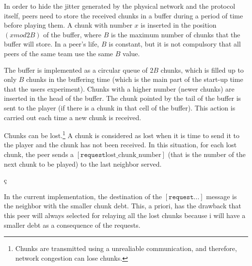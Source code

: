 
\label{sec:buffering_chunks}

In order to hide the jitter generated by the physical network and the
protocol itself, peers need to store the received chunks in a buffer
during a period of time before playing them. A chunk with number $x$
is inserted in the position $(x \mathit{mod} 2B)$ of the buffer, where
$B$ is the maximum number of chunks that the buffer will store. In a
peer's life, $B$ is constant, but it is not compulsory that all peers
of the same team use the same $B$ value.

The buffer is implemented as a circular queue of $2B$ chunks, which is
filled up to only $B$ chunks in the buffering time (which is the main
part of the start-up time that the users experiment). Chunks with a
higher number (newer chunks) are inserted in the head of the
buffer. The chunk pointed by the tail of the buffer is sent to the
player (if there is a chunk in that cell of the buffer). This action
is carried out each time a new chunk is received.

Chunks can be lost.\footnote{Chunks are transmitted using a
  unrealiable communication, and therefore, network congestion can
  lose chunks.} A chunk is considered as lost when it is time to send
it to the player and the chunk has not been received.  In this
situation, for each lost chunk, the peer sends a $[\mathtt{request}
  \text{lost\_chunk\_number}]$ (that is the number of the next chunk
to be played) to the last neighbor served.

\begin{comment}
origin peer of the next chunk stored in the
buffer. This peer has to characteristics: (1) it is not necessary a
neighbor peer, and (2) there is a high probability that this chunk has
been stored in the buffer ``for a long time'', so, if it is not a
neighbor, the link between it and the peer is working fairly well.
\end{comment}ç

\begin{notex}
  In the current implementation, the destination of the
  $[\mathtt{request} ...]$ message is the neighbor with the smaller
  chunk debt. This, a priori, has the drawback that this peer will
  always selected for relaying all the lost chunks because i will have
  a smaller debt as a consequence of the requests.
\end{notex}
  
